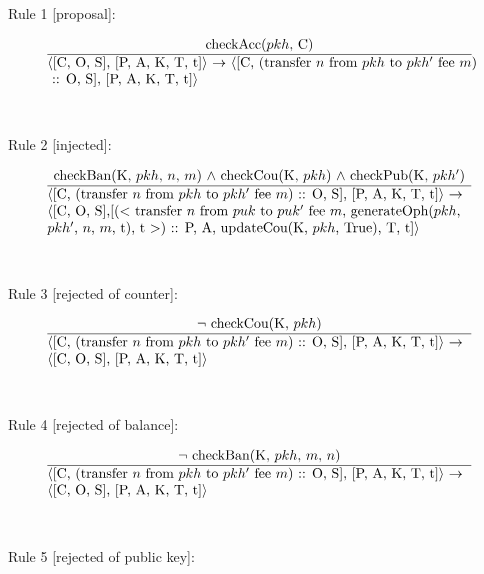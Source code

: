 \documentclass[a4paper]{llncs}
\begin{document}
Rule 1 [proposal]:

\begin{equation}{}
\frac{\text{checkAcc($pkh$, C)}}{\parbox{4.2in}{\text{$\langle$[C, O, S], [P, A, K, T, t]$\rangle$ $\rightarrow$ $\langle$[C, (transfer $n$ from $pkh$ to $pkh'$ fee $m$)} \\\text{ :: O, S], [P, A, K, T, t]$\rangle$}}} 
\end{equation}
\\
\\
Rule 2 [injected]:

\begin{equation}{}
\frac{\text{checkBan(K, $pkh$, $n$, $m$) $\wedge$ checkCou(K, $pkh$) $\wedge$ checkPub(K, $pkh'$)}}{\parbox{4.2in}{\text{$\langle$[C, (transfer $n$ from $pkh$ to $pkh'$ fee $m$) :: O, S], [P, A, K, T, t]$\rangle$ $\rightarrow$}\\
\text{$\langle$[C, O, S],[($<$ transfer $n$ from $puk$ to $puk'$ fee $m$, generateOph($pkh$, }\\
\text{$pkh'$, $n$, $m$, t), t $>$) :: P, A, updateCou(K, $pkh$, True), T, t]$\rangle$}}} 
\end{equation}
\\
\\
Rule 3 [rejected of counter]:

\begin{equation}{}
\frac{\text{$\neg$ checkCou(K, $pkh$)}}{\parbox{4.2in}{\text{$\langle$[C, (transfer $n$ from $pkh$ to $pkh'$ fee $m$) :: O, S], [P, A, K, T, t]$\rangle$ $\rightarrow$ }\\
\text{$\langle$[C, O, S], [P, A, K, T, t]$\rangle$}}} 
\end{equation}
\\
\\
Rule 4 [rejected of balance]:

\begin{equation}{}
\frac{\text{$\neg$ checkBan(K, $pkh$, $m$, $n$)}}{\parbox{4.2in}{\text{$\langle$[C, (transfer $n$ from $pkh$ to $pkh'$ fee $m$) :: O, S], [P, A, K, T, t]$\rangle$ $\rightarrow$ }\\
\text{$\langle$[C, O, S], [P, A, K, T, t]$\rangle$}}} 
\end{equation}
\\
\\
Rule 5 [rejected of public key]:
\end{document}
